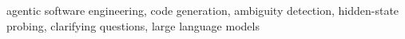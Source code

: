 \documentclass[conference]{IEEEtran}
\begin{document}
\begin{IEEEkeywords}
agentic software engineering, code generation, ambiguity detection, hidden-state probing, clarifying questions, large language models
\end{IEEEkeywords}











\end{document}

